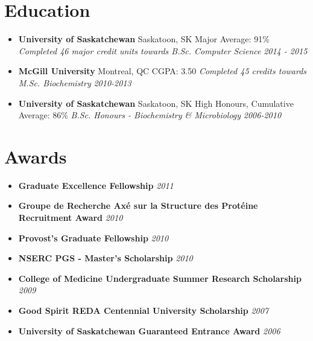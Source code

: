 \documentclass[letterpaper,11pt]{article}
\newcommand{\resumeSubHeadingEducation}[5]{
	\item[]
      \textbf{#1} \hfill #2 \newline
      #3 \newline
      \textit{#4} \hfill \textit{#5}
}
\newcommand{\award}[2]{
	\item[]
	  \textbf{#1} \hfill \textit{#2}
}
\begin{document}
\section{Education}
	\begin{itemize}[leftmargin=*]
	    \resumeSubHeadingEducation
	      {University of Saskatchewan}{Saskatoon, SK}
	      {Major Average: 91\%}
	      {Completed 46 major credit units towards B.Sc. Computer Science}{2014 - 2015}
	    \resumeSubHeadingEducation
	      {McGill University}{Montreal, QC}
	      {CGPA: 3.50}
	      {Completed 45 credits towards M.Sc. Biochemistry}{2010-2013}
      \resumeSubHeadingEducation
        {University of Saskatchewan}{Saskatoon, SK}
        {High Honours, Cumulative Average: 86\%}
        {B.Sc. Honours - Biochemistry \& Microbiology}{2006-2010}
     \end{itemize}

\section{Awards}
 \begin{itemize}[leftmargin=*,noitemsep,topsep=0pt]
	\award{Graduate Excellence Fellowship}{2011}
	\award{Groupe de Recherche Axé sur la Structure des Protéine Recruitment Award}{2010}
	\award{Provost’s Graduate Fellowship}{2010}
	\award{NSERC PGS - Master’s Scholarship}{2010}
	\award{College of Medicine Undergraduate Summer Research Scholarship}{2009}
	\award{Good Spirit REDA Centennial University Scholarship}{2007}
	\award{University of Saskatchewan Guaranteed Entrance Award}{2006}
  \end{itemize}

\end{document}
